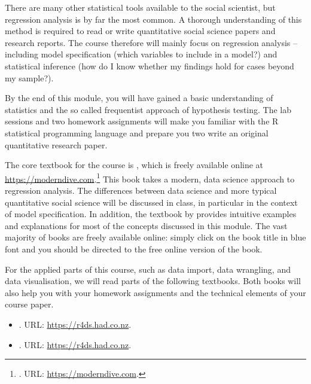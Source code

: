 \documentclass[abstract=on,parskip=full,headings=standardclasses,fontsize=11pt,paper=a4]{scrartcl}
\begin{document}
There are many other statistical tools available to the social scientist, but regression analysis is by far the most common. A thorough understanding of this method is required to read or write quantitative social science papers and research reports. The course therefore will mainly focus on regression analysis -- including model specification (which variables to include in a model?) and statistical inference (how do I know whether my findings hold for cases beyond my sample?).

By the end of this module, you will have gained a basic understanding of statistics and the so called frequentist approach of hypothesis testing. The lab sessions and two homework assignments will make you familiar with the \textsf{R} statistical programming language and prepare you two write an original quantitative research paper. 


The core textbook for the course is \textcite{ismay20}, which is freely available online at \url{https://moderndive.com}.\footnote{. URL: \url{https://moderndive.com}.} This book takes a modern, data science approach to regression analysis. The differences between data science and more typical quantitative social science will be discussed in class, in particular in the context of model specification. In addition, the textbook by \textcite{llaudet22} provides intuitive examples and explanations for most of the concepts discussed in this module. The vast majority of books are freely available online: simply click on the book title in blue font and you should be directed to the free online version of the book. %

For the applied parts of this course, such as data import, data wrangling, and data visualisation, we will read parts of the following textbooks. Both books will also help you with your homework assignments and the technical elements of your course paper. 

\begin{itemize}
\item {}. URL: \url{https://r4ds.had.co.nz}.
\item {}. URL: \url{https://r4ds.had.co.nz}.
\end{itemize}
\end{document}
